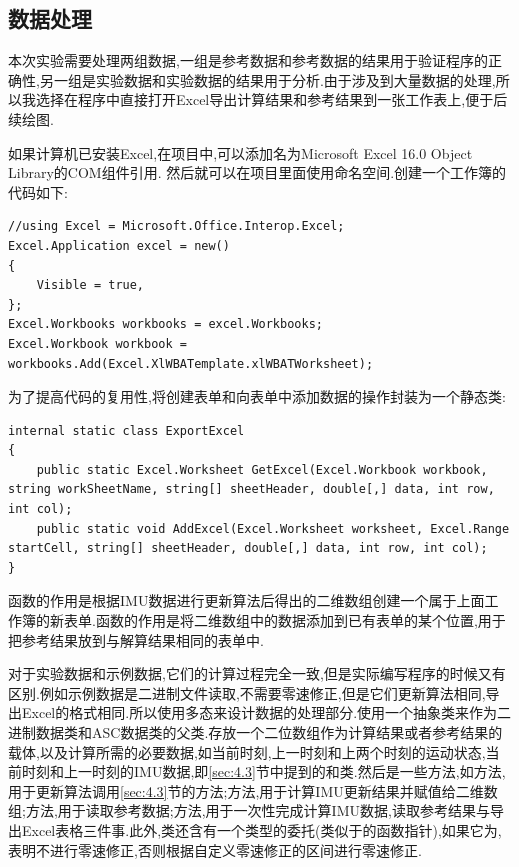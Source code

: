 \documentclass[10pt,a4paper]{ctexart}
\begin{document}
\subsection{数据处理}
本次实验需要处理两组数据,一组是参考数据和参考数据的结果用于验证程序的正确性,另一组是实验数据和实验数据的结果用于分析.由于涉及到大量数据的处理,所以我选择在程序中直接打开\textsf{Excel}导出计算结果和参考结果到一张工作表上,便于后续绘图.

如果计算机已安装\textsf{Excel},在项目中,可以添加名为\textsf{Microsoft Excel 16.0 Object Library}的\textsf{COM}组件引用.
然后就可以在项目里面使用命名空间.创建一个工作簿的代码如下:
\begin{lstlisting}
//using Excel = Microsoft.Office.Interop.Excel;
Excel.Application excel = new()
{
    Visible = true,
};
Excel.Workbooks workbooks = excel.Workbooks;
Excel.Workbook workbook = workbooks.Add(Excel.XlWBATemplate.xlWBATWorksheet);
\end{lstlisting}
为了提高代码的复用性,将创建表单和向表单中添加数据的操作封装为一个静态类:
\begin{lstlisting}
internal static class ExportExcel
{
    public static Excel.Worksheet GetExcel(Excel.Workbook workbook, string workSheetName, string[] sheetHeader, double[,] data, int row, int col);
    public static void AddExcel(Excel.Worksheet worksheet, Excel.Range startCell, string[] sheetHeader, double[,] data, int row, int col);
}
\end{lstlisting}
函数的作用是根据\textsf{IMU}数据进行更新算法后得出的二维数组创建一个属于上面工作簿的新表单.函数的作用是将二维数组中的数据添加到已有表单的某个位置,用于把参考结果放到与解算结果相同的表单中.

对于实验数据和示例数据,它们的计算过程完全一致,但是实际编写程序的时候又有区别.例如示例数据是二进制文件读取,不需要零速修正,但是它们更新算法相同,导出\textsf{Excel}的格式相同.所以使用多态来设计数据的处理部分.使用一个抽象类来作为二进制数据类和\textsf{ASC}数据类的父类.存放一个二位数组作为计算结果或者参考结果的载体,以及计算所需的必要数据,如当前时刻,上一时刻和上两个时刻的运动状态,当前时刻和上一时刻的\textsf{IMU}数据,即\ref{sec:4.3}节中提到的和类.然后是一些方法,如方法,用于更新算法调用\ref{sec:4.3}节的方法;方法,用于计算\textsf{IMU}更新结果并赋值给二维数组;方法,用于读取参考数据;方法,用于一次性完成计算\textsf{IMU}数据,读取参考结果与导出\textsf{Excel}表格三件事.此外,类还含有一个类型的委托(类似于的函数指针),如果它为,表明不进行零速修正,否则根据自定义零速修正的区间进行零速修正.
\end{document}

